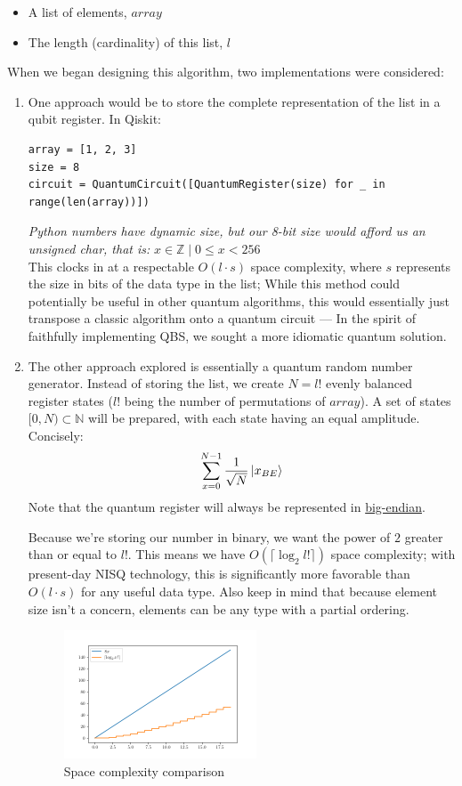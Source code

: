 \documentclass[12pt]{article}
\begin{document}
\begin{itemize}
    \item A list of elements, $array$
    \item The length (cardinality) of this list, $l$
\end{itemize}

\noindent When we began designing this algorithm, two implementations were considered:
\begin{enumerate}
\item One approach would be to store the complete representation of the list in a qubit register. In Qiskit:
\begin{verbatim}
array = [1, 2, 3]
size = 8
circuit = QuantumCircuit([QuantumRegister(size) for _ in range(len(array))])
\end{verbatim}
\textit{Python numbers have dynamic size, but our 8-bit size would afford us an unsigned char, that is:}
$ x \in \mathbb{Z} \mid 0 \leq x < 256 $ \\
This clocks in at a respectable $ O(l \cdot s) $ space complexity, where $ s $ represents the size in bits of the data type in the list; While this method could potentially be useful in other quantum algorithms, this would essentially just transpose a classic algorithm onto a quantum circuit --- In the spirit of faithfully implementing QBS, we sought a more idiomatic quantum solution.
 
\item The other approach explored is essentially a quantum random number generator. Instead of storing the list, we create $N = l!$ evenly balanced register states ($l!$ being the number of permutations of $array$). A set of states $[0, N) \subset \mathbb{N}$ will be prepared, with each state having an equal amplitude. Concisely:
    $$ \sum_{x=0}^{N-1} \frac{1}{\sqrt{N}} \ket{x_{BE}} $$
Note that the quantum register will always be represented in \href{https://en.wikipedia.org/wiki/Endianness}{big-endian}.

Because we're storing our number in binary, we want the power of $2$ greater than or equal to $l!$. This means we have $O(\lceil \log_2 l! \rceil)$ space complexity; with present-day NISQ technology, this is significantly more favorable than $O(l \cdot s)$ for any useful data type. Also keep in mind that because element size isn't a concern, elements can be any type with a partial ordering.

\begin{figure}[h]
    \centering
    \includegraphics[width=0.54\textwidth]{images/size_compare.png}
    \caption{Space complexity comparison}
    \label{fig:chart1}
\end{figure}


\end{enumerate}
\end{document}
